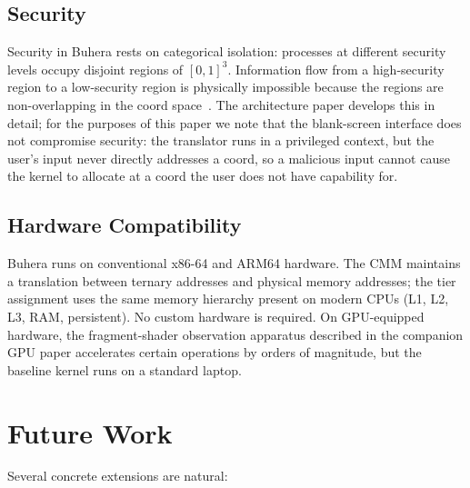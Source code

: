 \documentclass[11pt,twocolumn,a4paper]{article}
\begin{document}
\subsection{Security}

Security in Buhera rests on categorical isolation: processes at different security levels occupy disjoint regions of $[0,1]^3$. Information flow from a high-security region to a low-security region is physically impossible because the regions are non-overlapping in the coord space~\cite{levy1984capability,miller2006robust}. The architecture paper develops this in detail; for the purposes of this paper we note that the blank-screen interface does not compromise security: the translator runs in a privileged context, but the user's input never directly addresses a coord, so a malicious input cannot cause the kernel to allocate at a coord the user does not have capability for.

\subsection{Hardware Compatibility}

Buhera runs on conventional x86-64 and ARM64 hardware. The CMM maintains a translation between ternary addresses and physical memory addresses; the tier assignment uses the same memory hierarchy present on modern CPUs (L1, L2, L3, RAM, persistent). No custom hardware is required. On GPU-equipped hardware, the fragment-shader observation apparatus described in the companion GPU paper accelerates certain operations by orders of magnitude, but the baseline kernel runs on a standard laptop.


\section{Future Work}
\label{sec:future}

Several concrete extensions are natural:
\end{document}
